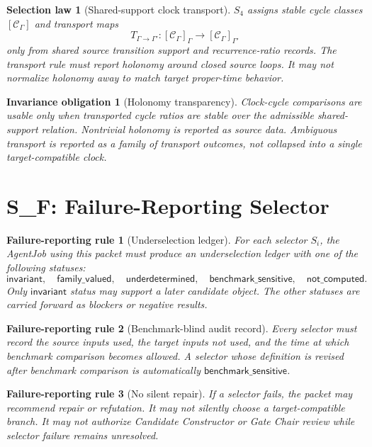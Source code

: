\documentclass[11pt]{article}
\newcommand{\Cycle}{\mathcal{C}_{\Gamma}}
\newtheorem{selectionlaw}{Selection law}
\newtheorem{obligation}{Invariance obligation}
\newtheorem{failure}{Failure-reporting rule}
\begin{document}
\begin{selectionlaw}[Shared-support clock transport]
\(S_4\) assigns stable cycle classes \([\Cycle]\) and transport maps
\[
T_{\Gamma\to\Gamma'}:[\Cycle]_{\Gamma}\to[\Cycle]_{\Gamma'}
\]
only from shared source transition support and recurrence-ratio records. The
transport rule must report holonomy around closed source loops. It may not
normalize holonomy away to match target proper-time behavior.
\end{selectionlaw}

\begin{obligation}[Holonomy transparency]
Clock-cycle comparisons are usable only when transported cycle ratios are
stable over the admissible shared-support relation. Nontrivial holonomy is
reported as source data. Ambiguous transport is reported as a family of
transport outcomes, not collapsed into a single target-compatible clock.
\end{obligation}

\section{S_F: Failure-Reporting Selector}

\begin{failure}[Underselection ledger]
For each selector \(S_i\), the AgentJob using this packet must produce an
underselection ledger with one of the following statuses:
\[
\mathsf{invariant},\quad
\mathsf{family\_valued},\quad
\mathsf{underdetermined},\quad
\mathsf{benchmark\_sensitive},\quad
\mathsf{not\_computed}.
\]
Only \(\mathsf{invariant}\) status may support a later candidate object. The
other statuses are carried forward as blockers or negative results.
\end{failure}

\begin{failure}[Benchmark-blind audit record]
Every selector must record the source inputs used, the target inputs not
used, and the time at which benchmark comparison becomes allowed. A selector
whose definition is revised after benchmark comparison is automatically
\(\mathsf{benchmark\_sensitive}\).
\end{failure}

\begin{failure}[No silent repair]
If a selector fails, the packet may recommend repair or refutation. It may
not silently choose a target-compatible branch. It may not authorize
Candidate Constructor or Gate Chair review while selector failure remains
unresolved.
\end{failure}
\end{document}
